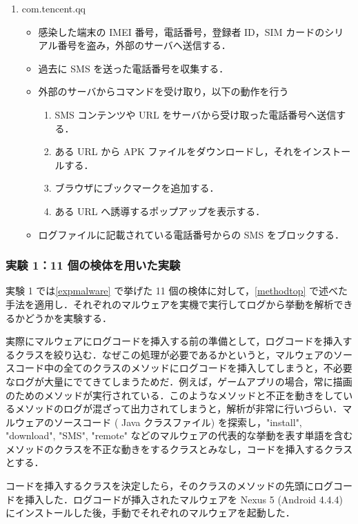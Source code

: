 \begin{enumerate}
\item com.tencent.qq
	\begin{itemize}
	\item 感染した端末の IMEI 番号，電話番号，登録者 ID，SIM カードのシリアル番号を盗み，外部のサーバへ送信する．
	\item 過去に SMS を送った電話番号を収集する．
	\item 外部のサーバからコマンドを受け取り，以下の動作を行う
	\begin{enumerate}
		\item SMS コンテンツや URL をサーバから受け取った電話番号へ送信する．
		\item ある URL から APK ファイルをダウンロードし，それをインストールする．
		\item ブラウザにブックマークを追加する．
		\item ある URL へ誘導するポップアップを表示する．
	\end{enumerate}
	\item ログファイルに記載されている電話番号からの SMS をブロックする．
	\end{itemize}
\end{enumerate}

\subsubsection{実験 1：11 個の検体を用いた実験}
\label{exp1}
実験 1 では\ref{expmalware} で挙げた 11 個の検体に対して，\ref{methodtop} で述べた手法を適用し．それぞれのマルウェアを実機で実行してログから挙動を解析できるかどうかを実験する．

実際にマルウェアにログコードを挿入する前の準備として，ログコードを挿入するクラスを絞り込む．なぜこの処理が必要であるかというと，マルウェアのソースコード中の全てのクラスのメソッドにログコードを挿入してしまうと，不必要なログが大量にでてきてしまうためだ．例えば，ゲームアプリの場合，常に描画のためのメソッドが実行されている．このようなメソッドと不正を動きをしているメソッドのログが混ざって出力されてしまうと，解析が非常に行いづらい．マルウェアのソースコード ( Java クラスファイル) を探索し，"install", "download", "SMS", "remote" などのマルウェアの代表的な挙動を表す単語を含むメソッドのクラスを不正な動きをするクラスとみなし，コードを挿入するクラスとする．

コードを挿入するクラスを決定したら，そのクラスのメソッドの先頭にログコードを挿入した．ログコードが挿入されたマルウェアを Nexus 5 (Android 4.4.4) にインストールした後，手動でそれぞれのマルウェアを起動した．

